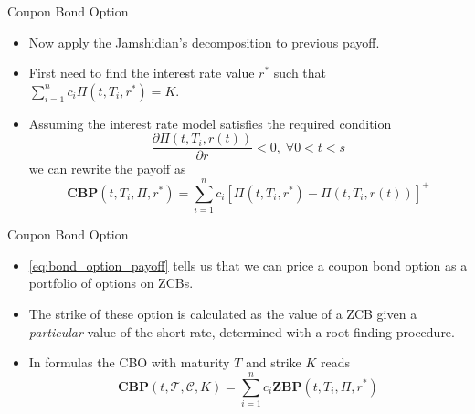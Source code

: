 \documentclass{beamer}
\begin{document}
\begin{frame}{Coupon Bond Option}
\begin{itemize}
	\item<1-> Now apply the Jamshidian's decomposition to previous payoff.
	\item<2-> First need to find the interest rate value $r^*$ such that $\sum_{i=1}^n c_i \Pi(t, T_i, r^*) = K$.
	\item<3-> Assuming the interest rate model satisfies the required condition
	\begin{equation*}
		\frac{\partial \Pi(t,T_i,r(t))}{\partial r}<0,\;\forall 0<t<s
	\end{equation*}
	we can rewrite the payoff as
	\begin{equation}
		\textbf{CBP}(t,T_i,\Pi,r^*) = \sum_{i=1}^n c_i [\Pi(t, T_i, r^*)-\Pi(t, T_i, r(t))]^+
	\label{eq:bond_option_payoff}
	\end{equation}
\end{itemize}
\end{frame}

\begin{frame}{Coupon Bond Option}
\begin{itemize}
	\item \cref{eq:bond_option_payoff} tells us that we can price a coupon bond option as a portfolio of options on ZCBs.
	\item The strike of these option is calculated as the value of a ZCB given a \emph{particular} value of the short rate, determined with a root finding procedure.
	\item In formulas the CBO with maturity $T$ and strike $K$ reads
	\begin{equation}
		\textbf{CBP}(t,\mathcal{T},\mathcal{C},K) = \sum_{i=1}^n c_i \textbf{ZBP}(t,T_i,\Pi,r^*)
	\end{equation}
\end{itemize}
\end{frame}
\end{document}
